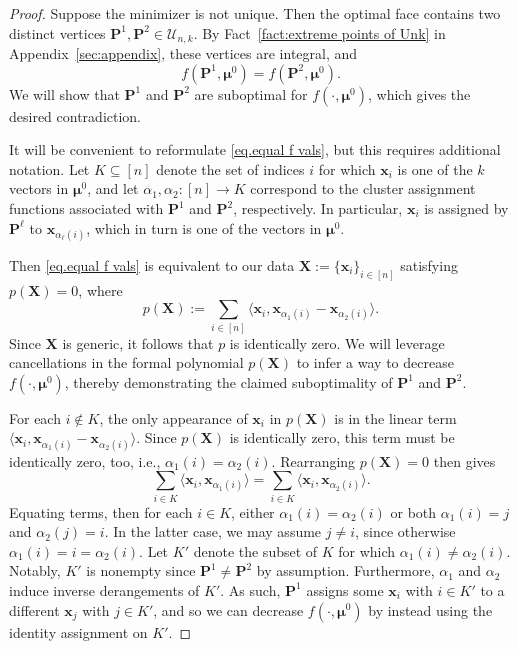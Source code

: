 \documentclass{article}
\theoremstyle{plain}
\theoremstyle{definition}
\newcommand{\1}{\mathbf{1}}
\newcommand{\bUnk}{\mathcal{U}_{n,k}}
\newcommand{\la}{\big\langle}
\newcommand{\ra}{\big\rangle}
\newcommand{\bmu}{\bm{\mu}}
\begin{document}
\begin{proof}
Suppose the minimizer is not unique.  
Then the optimal face contains two distinct vertices $\bm{P}^1,\bm{P}^2\in\bUnk$.  
By Fact~\ref{fact:extreme points of Unk} in Appendix~\ref{sec:appendix}, these vertices are integral, and
\begin{equation}
\label{eq.equal f vals}
f(\bm{P}^1,\bmu^0)=f(\bm{P}^2,\bmu^0).
\end{equation}
We will show that $\bm{P}^1$ and $\bm{P}^2$ are suboptimal for $f(\cdot,\bmu^0)$, which gives the desired contradiction.

It will be convenient to reformulate \eqref{eq.equal f vals}, but this requires additional notation.
Let $K\subseteq[n]$ denote the set of indices $i$ for which $\bm{x}_i$ is one of the $k$ vectors in $\bmu^0$, and let $\alpha_1,\alpha_2\colon [n]\to K$ correspond to the cluster assignment functions associated with $\bm{P}^1$ and $\bm{P}^2$, respectively.
In particular, $\bm{x}_i$ is assigned by $\bm{P}^\ell$ to $\bm{x}_{\alpha_\ell(i)}$, which in turn is one of the vectors in $\bmu^0$.

Then \eqref{eq.equal f vals} is equivalent to our data $\bm{X}:=\{\bm{x}_i\}_{i\in[n]}$ satisfying $p(\bm{X})=0$, where
\[
p(\bm{X}) 
:= \sum_{i\in [n]} \la \bm{x}_i, \bm{x}_{\alpha_1(i)} - \bm{x}_{\alpha_2(i)} \ra.
\]
Since $\bm{X}$ is generic, it follows that $p$ is identically zero.
We will leverage cancellations in the formal polynomial $p(\bm{X})$ to infer a way to decrease $f(\cdot,\bmu^0)$, thereby demonstrating the claimed suboptimality of $\bm{P}^1$ and $\bm{P}^2$.

For each $i\not\in K$, the only appearance of $\bm{x}_i$ in $p(\bm{X})$ is in the linear term $\la \bm{x}_i, \bm{x}_{\alpha_1(i)} - \bm{x}_{\alpha_2(i)} \ra$.
Since $p(\bm{X})$ is identically zero, this term must be identically zero, too, i.e., $\alpha_1(i)=\alpha_2(i)$. 
Rearranging $p(\bm{X})=0$ then gives
\[
\sum_{i\in K} \la \bm{x}_i, \bm{x}_{\alpha_1(i)} \ra
=\sum_{i\in K} \la \bm{x}_i,  \bm{x}_{\alpha_2(i)} \ra.
\]
Equating terms, then for each $i\in K$, either $\alpha_1(i)=\alpha_2(i)$ or both $\alpha_1(i)=j$ and $\alpha_2(j)=i$.
In the latter case, we may assume $j\neq i$, since otherwise $\alpha_1(i)=i=\alpha_2(i)$.
Let $K'$ denote the subset of $K$ for which $\alpha_1(i)\neq\alpha_2(i)$.
Notably, $K'$ is nonempty since $\bm{P}^1\neq\bm{P}^2$ by assumption.
Furthermore, $\alpha_1$ and $\alpha_2$ induce inverse derangements of $K'$.
As such, $\bm{P}^1$ assigns some $\bm{x}_i$ with $i\in K'$ to a different $\bm{x}_j$ with $j\in K'$, and so we can decrease $f(\cdot,\bmu^0)$ by instead using the identity assignment on $K'$.
\end{proof}
\end{document}
